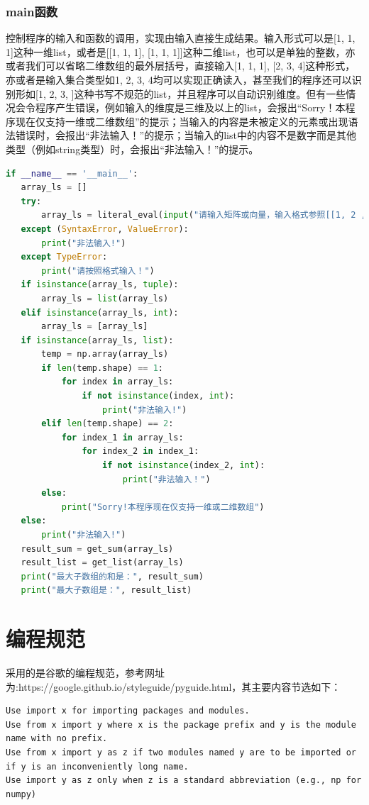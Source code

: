 \documentclass{article}
\begin{document}
\subsubsection{main函数}
控制程序的输入和函数的调用，实现由输入直接生成结果。输入形式可以是[1, 1, 1]这种一维list，或者是[[1, 1, 1], [1, 1, 1]]这种二维list，也可以是单独的整数，亦或者我们可以省略二维数组的最外层括号，直接输入[1, 1, 1], [2, 3, 4]这种形式，亦或者是输入集合类型如{1, 2, 3, 4}均可以实现正确读入，甚至我们的程序还可以识别形如[1, 2, 3, ]这种书写不规范的list，并且程序可以自动识别维度。\textcolor[rgb]{0,0.8,1}{但有一些情况会令程序产生错误，例如输入的维度是三维及以上的list，会报出“Sorry！本程序现在仅支持一维或二维数组”的提示；当输入的内容是未被定义的元素或出现语法错误时，会报出“非法输入！”的提示；当输入的list中的内容不是数字而是其他类型（例如string类型）时，会报出“非法输入！”的提示。}
\begin{lstlisting}[language = Python]
if __name__ == '__main__':
   array_ls = []
   try:
       array_ls = literal_eval(input("请输入矩阵或向量，输入格式参照[[1, 2 ,3], [4, 5, 6]]或[1, 2, 3, 4], [1, 2, 3, 4]:"))
   except (SyntaxError, ValueError):
       print("非法输入!")
   except TypeError:
       print("请按照格式输入！")
   if isinstance(array_ls, tuple):
       array_ls = list(array_ls)
   elif isinstance(array_ls, int):
       array_ls = [array_ls]
   if isinstance(array_ls, list):
       temp = np.array(array_ls)
       if len(temp.shape) == 1:
           for index in array_ls:
               if not isinstance(index, int):
                   print("非法输入!")
       elif len(temp.shape) == 2:
           for index_1 in array_ls:
               for index_2 in index_1:
                   if not isinstance(index_2, int):
                       print("非法输入！")
       else:
           print("Sorry!本程序现在仅支持一维或二维数组")
   else:
       print("非法输入!")
   result_sum = get_sum(array_ls)
   result_list = get_list(array_ls)
   print("最大子数组的和是：", result_sum)
   print("最大子数组是：", result_list)  
\end{lstlisting}
\section{编程规范}
\large 
采用的是谷歌的编程规范，参考网址为:https://google.github.io/styleguide/pyguide.html，其主要内容节选如下：
\begin{lstlisting}
Use import x for importing packages and modules.
Use from x import y where x is the package prefix and y is the module name with no prefix.
Use from x import y as z if two modules named y are to be imported or if y is an inconveniently long name.
Use import y as z only when z is a standard abbreviation (e.g., np for numpy) 
\end{lstlisting}
\end{document}
